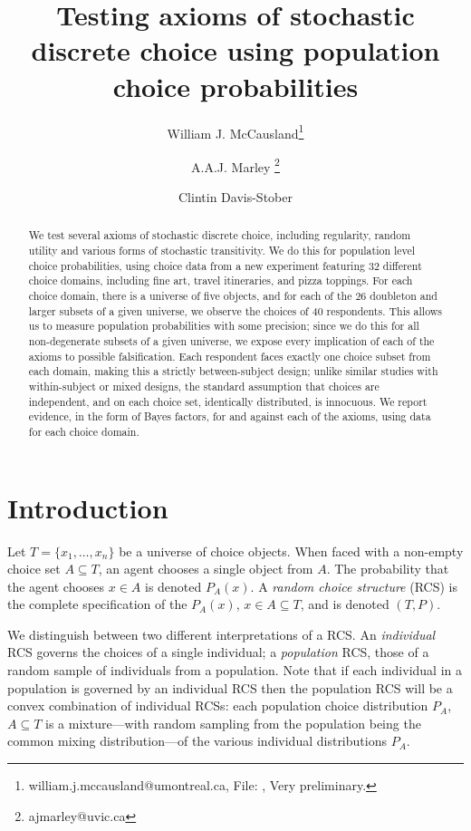 \documentclass[11pt,letter]{article}
\title{Testing axioms of stochastic discrete choice using population choice probabilities}
\author[1]{William J. McCausland\thanks{william.j.mccausland@umontreal.ca, File: \texttt{\currfilename}, Very preliminary.}}
\author[2]{A.A.J. Marley \thanks{ajmarley@uvic.ca}}
\author[3]{Clintin Davis-Stober}
\affil[1]{Universit\'e de Montr\'eal}
\affil[2]{University of Victoria}
\affil[3]{University of Missouri}
\begin{document}
\maketitle

\begin{abstract}
	We test several axioms of stochastic discrete choice, including regularity, random utility and various forms of stochastic transitivity.
	We do this for population level choice probabilities, using choice data from a new experiment featuring 32 different choice domains, including fine art, travel itineraries, and pizza toppings.
	For each choice domain, there is a universe of five objects, and for each of the 26 doubleton and larger subsets of a given universe, we observe the choices of 40 respondents.
	This allows us to measure population probabilities with some precision; since we do this for all non-degenerate subsets of a given universe, we expose every implication of each of the axioms to possible falsification.
	Each respondent faces exactly one choice subset from each domain, making this a strictly between-subject design; unlike similar studies with within-subject or mixed designs, the standard assumption that choices are independent, and on each choice set, identically distributed, is innocuous.
	We report evidence, in the form of Bayes factors, for and against each of the axioms, using data for each choice domain.
\end{abstract}

\section{Introduction}

Let $T = \{x_1,\ldots,x_n\}$ be a universe of choice objects.
When faced with a non-empty choice set $A \subseteq T$, an agent chooses a single object from $A$.
The probability that the agent chooses $x \in A$ is denoted $P_A(x)$.
A {\em random choice structure} (RCS) is the complete specification of the $P_A(x)$, $x \in A \subseteq T$, and is denoted $(T,P)$.

We distinguish between two different interpretations of a RCS.
An {\em individual} RCS governs the choices of a single individual; a {\em population} RCS, those of a random sample of individuals from a population.
Note that if each individual in a population is governed by an individual RCS then the population RCS will be a convex combination of individual RCSs: each population choice distribution $P_A$, $A \subseteq T$ is a mixture---with random sampling from the population being the common mixing distribution---of the various individual distributions $P_A$.
\end{document}
